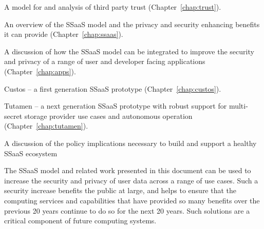 \begin{packed_item}
\item A model for and analysis of third party trust
  (Chapter~\ref{chap:trust}).
\item An overview of the SSaaS model and the privacy and security
  enhancing benefits it can provide (Chapter~\ref{chap:ssaas}).
\item A discussion of how the SSaaS model can be integrated to improve
  the security and privacy of a range of user and developer facing
  applications (Chapter~\ref{chap:apps}).
\item Custos -- a first generation SSaaS prototype
  (Chapter~\ref{chap:custos}).
\item Tutamen -- a next generation SSaaS prototype with robust support
  for multi-secret storage provider use cases and autonomous operation
  (Chapter~\ref{chap:tutamen}).
\item A discussion of the policy implications necessary to build and
  support a healthy SSaaS ecosystem
\end{packed_item}

The SSaaS model and related work presented in this document can be
used to increase the security and privacy of user data across a range
of use cases. Such a security increase benefits the public at large,
and helps to ensure that the computing services and capabilities that
have provided so many benefits over the previous 20 years continue to
do so for the next 20 years. Such solutions are a critical component
of future computing systems.

